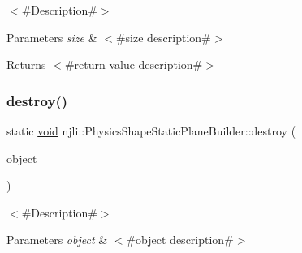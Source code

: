 $<$\#\+Description\#$>$


\begin{DoxyParams}{Parameters}
{\em size} & $<$\#size description\#$>$\\
\hline
\end{DoxyParams}
\begin{DoxyReturn}{Returns}
$<$\#return value description\#$>$ 
\end{DoxyReturn}
\mbox{\label{classnjli_1_1_physics_shape_static_plane_builder_ab47d6a0315188d9fab36ad76f752bead}} 
\subsubsection{\texorpdfstring{destroy()}{destroy()}}
{\footnotesize\ttfamily static \mbox{\hyperlink{_thread_8h_af1e856da2e658414cb2456cb6f7ebc66}{void}} njli\+::\+Physics\+Shape\+Static\+Plane\+Builder\+::destroy (\begin{DoxyParamCaption}\item[{\mbox{\hyperlink{classnjli_1_1_physics_shape_static_plane_builder}{Physics\+Shape\+Static\+Plane\+Builder}} $\ast$}]{object }\end{DoxyParamCaption})\hspace{0.3cm}{\ttfamily [static]}}

$<$\#\+Description\#$>$


\begin{DoxyParams}{Parameters}
{\em object} & $<$\#object description\#$>$ \\
\hline
\end{DoxyParams}
\mbox{\label{classnjli_1_1_physics_shape_static_plane_builder_a386cb12ab6cf40799b5e92e19367ebcb}} 
